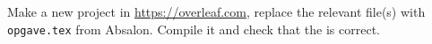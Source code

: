 \label{latex:opgave}
Make a new project in \url{https://overleaf.com}, replace the relevant file(s) with \lstinline[language=console]{opgave.tex} from Absalon. Compile it and check that the is correct.